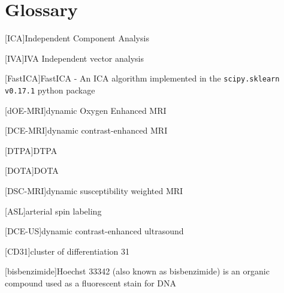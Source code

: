 
\chapter{Glossary}




\begin{acronym}

[ICA]{Independent Component Analysis}%

[IVA]{IVA Independent vector analysis}

[FastICA]{FastICA -  An ICA algorithm implemented in the \texttt{scipy.sklearn v0.17.1} python package}

[dOE-MRI]{dynamic Oxygen Enhanced MRI}%

[DCE-MRI]{dynamic contrast-enhanced MRI}

[DTPA]{DTPA}

[DOTA]{DOTA}

[DSC-MRI]{dynamic susceptibility weighted MRI}

[ASL]{arterial spin labeling}

[DCE-US]{dynamic contrast-enhanced ultrasound}%

[CD31]{cluster of differentiation 31}%

[bisbenzimide]{Hoechst 33342 (also known as bisbenzimide) is an organic compound used as a fluorescent stain for DNA}


\end{acronym}
